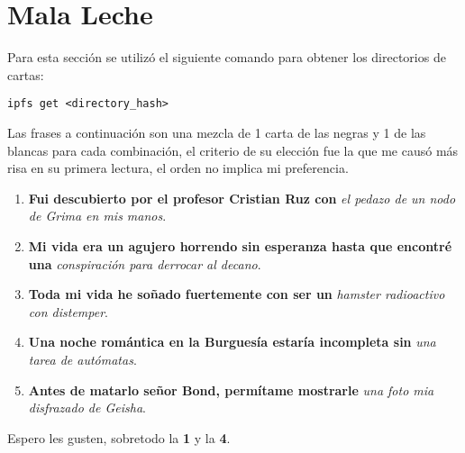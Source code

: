 \documentclass[letterpaper,10pt]{article}
\begin{document}
\section{Mala Leche}

Para esta sección se utilizó el siguiente comando para obtener los directorios de cartas:

\begin{center}
	\texttt{ipfs get <directory\_hash>}
\end{center}

Las frases a continuación son una mezcla de 1 carta de las negras y 1 de las blancas para cada combinación, el criterio de su elección fue la que me causó más risa en su primera lectura, el orden no implica mi preferencia.

\begin{enumerate}
\item \textbf{Fui descubierto por el profesor Cristian Ruz con} \textit{el pedazo de un nodo de Grima en mis manos}.
\item \textbf{Mi vida era un agujero horrendo sin esperanza hasta que encontré una} \textit{conspiración para derrocar al decano}.
\item \textbf{Toda mi vida he soñado fuertemente con ser un} \textit{hamster radioactivo con distemper}.
\item \textbf{Una noche romántica en la Burguesía estaría incompleta sin} \textit{una tarea de autómatas}.
\item \textbf{Antes de matarlo señor Bond, permítame mostrarle} \textit{una foto mia disfrazado de Geisha}.
\end{enumerate}

Espero les gusten, sobretodo la \textbf{1} y la \textbf{4}.
\end{document}
